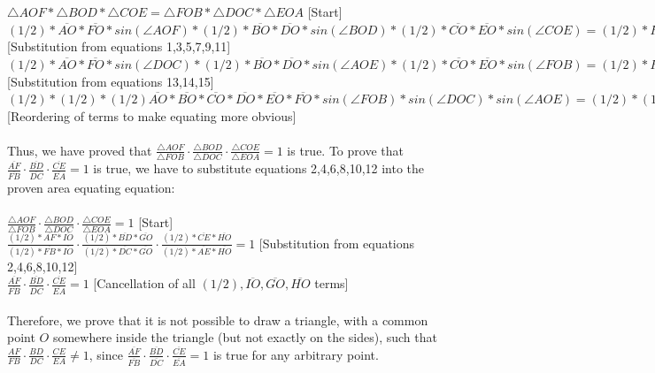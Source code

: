 \begin{Questions}
{  \\ 
  \\$\triangle AOF *\triangle BOD * \triangle COE=\triangle FOB*\triangle DOC*\triangle EOA$ [Start]
  \\$(1/2)*\overline{AO}*\overline{FO}*sin(\angle AOF) * (1/2)*\overline{BO}*\overline{DO}*sin(\angle BOD)* (1/2)*\overline{CO}*\overline{EO}*sin(\angle COE) = (1/2)*\overline{FO}*\overline{BO}*sin(\angle FOB)* (1/2)*\overline{DO}*\overline{CO}*sin(\angle DOC) (1/2)*\overline{AO}*\overline{EO}*sin(\angle AOE)$ [Substitution from equations 1,3,5,7,9,11]
  \\$(1/2)*\overline{AO}*\overline{FO}*sin(\angle DOC) * (1/2)*\overline{BO}*\overline{DO}*sin(\angle AOE)* (1/2)*\overline{CO}*\overline{EO}*sin(\angle FOB) = (1/2)*\overline{FO}*\overline{BO}*sin(\angle FOB)* (1/2)*\overline{DO}*\overline{CO}*sin(\angle DOC) (1/2)*\overline{AO}*\overline{EO}*sin(\angle AOE)$ [Substitution from equations 13,14,15]
  \\$(1/2)*(1/2)*(1/2)\overline{AO}*\overline{BO}*\overline{CO}*\overline{DO}*\overline{EO}*\overline{FO}*sin(\angle FOB)*sin(\angle DOC)*sin(\angle AOE) = (1/2)*(1/2)*(1/2)\overline{AO}*\overline{BO}*\overline{CO}*\overline{DO}*\overline{EO}*\overline{FO}*sin(\angle FOB)*sin(\angle DOC)*sin(\angle AOE)$ [Reordering of terms to make equating more obvious]
  \\
  \\Thus, we have proved that $\frac{\triangle AOF}{\triangle FOB}\cdot \frac{\triangle BOD}{\triangle DOC} \cdot \frac{\triangle COE}{\triangle EOA} = 1$ is true. To prove that $\frac{\overline{AF}}{\overline{FB}}\cdot \frac{\overline{BD}}{\overline{  DC}} \cdot \frac{\overline{  CE}}{\overline{  EA}} = 1$ is true, we have to substitute equations 2,4,6,8,10,12 into the proven area equating equation:
  \\
  \\$\frac{\triangle AOF}{\triangle FOB}\cdot \frac{\triangle BOD}{\triangle DOC} \cdot \frac{\triangle COE}{\triangle EOA} = 1$ [Start]
  \\$\frac{(1/2)*\overline{AF}*\overline{IO}}{(1/2)*\overline{FB}*\overline{IO}}\cdot \frac{(1/2)*\overline{BD}*\overline{GO}}{(1/2)*\overline{DC}*\overline{GO}} \cdot \frac{(1/2)*\overline{CE}*\overline{HO}}{(1/2)*\overline{AE}*\overline{HO}} = 1$ [Substitution from equations 2,4,6,8,10,12]
  \\$\frac{\overline{AF}}{\overline{FB}}\cdot \frac{\overline{BD}}{\overline{  DC}} \cdot \frac{\overline{  CE}}{\overline{  EA}} = 1$ [Cancellation of all $(1/2),\overline{IO},\overline{GO},\overline{HO}$ terms]
  \\
  \\Therefore, we prove that it is not possible to draw a triangle, with a common point $O$ somewhere inside the triangle (but not exactly on the sides), such that $\frac{AF}{FB}\cdot \frac{BD}{DC} \cdot \frac{CE}{EA} \neq 1$, since $\frac{\overline{AF}}{\overline{FB}}\cdot \frac{\overline{BD}}{\overline{  DC}} \cdot \frac{\overline{  CE}}{\overline{  EA}} = 1$ is true for any arbitrary point.
  \\
  \\\boxed{}
  }
  \vfill\eject
  \end{Questions}